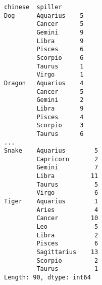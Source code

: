 \documentclass[12pt,fleqn]{article}\usepackage{../common}
\begin{document}
\begin{verbatim}
chinese  spiller 
Dog      Aquarius    5
         Cancer      5
         Gemini      9
         Libra       9
         Pisces      6
         Scorpio     6
         Taurus      1
         Virgo       1
Dragon   Aquarius    4
         Cancer      5
         Gemini      2
         Libra       9
         Pisces      4
         Scorpio     3
         Taurus      6
...
Snake    Aquarius        5
         Capricorn       2
         Gemini          7
         Libra          11
         Taurus          5
         Virgo           6
Tiger    Aquarius        1
         Aries           4
         Cancer         10
         Leo             5
         Libra           2
         Pisces          6
         Sagittarius    13
         Scorpio         2
         Taurus          1
Length: 90, dtype: int64
\end{verbatim}
\end{document}
